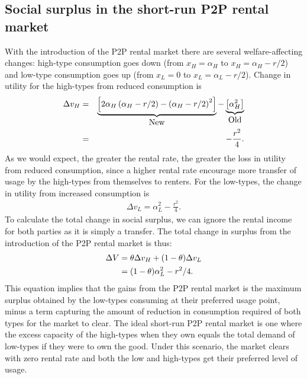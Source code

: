 \documentclass[11pt]{article}
\begin{document}
\subsection{Social surplus in the short-run P2P rental market} 
With the introduction of the P2P rental market there are several welfare-affecting changes: 
high-type consumption goes down (from $x_H = \alpha_H$ to  $x_H = \alpha_H - r/2$) and low-type consumption goes up (from $x_L = 0$ to $x_L = \alpha_L - r/2$). 
Change in utility for the high-types from reduced consumption is 
\begin{eqnarray}
\Delta v_H &=& \underbrace{\left[2 \alpha_H \left(\alpha_H - r/2\right) - \left(\alpha_H - r/2\right)^2 \right]}_{\mbox{New}} - 
                             \underbrace{\left[\alpha_H^2 \right]}_{\mbox{Old}}   \notag \\
           &=& - \frac{r^2}{4}. 
\end{eqnarray} 
As we would expect, the greater the rental rate, the greater the loss in utility from reduced consumption, since a higher rental rate encourage more transfer of usage by the high-types from themselves to renters. 
For the low-types, the change in utility from increased consumption is
\begin{align}
\Delta v_L = \alpha_L^2 - \frac{r^2}{4}. 
\end{align} 
To calculate the total change in social surplus, we can ignore the rental income for both parties as it is simply a transfer. 
The total change in surplus from the introduction of the P2P rental market is thus: 
\begin{align}
\Delta V &= \theta \Delta v_H + (1-\theta) \Delta v_L \notag \\ 
         & = (1-\theta) \alpha_L^2 - r^2/4.
\end{align}
This equation implies that the gains from the P2P rental market is the maximum surplus obtained by the low-types consuming at their preferred usage point, minus a term capturing the amount of reduction in consumption required of both types for the market to clear.
The ideal short-run P2P rental market is one where the excess capacity of the high-types when they own equals the total demand of low-types if they were to own the good.
Under this scenario, the market clears with zero rental rate and both the low and high-types get their preferred level of usage. 
\end{document}
